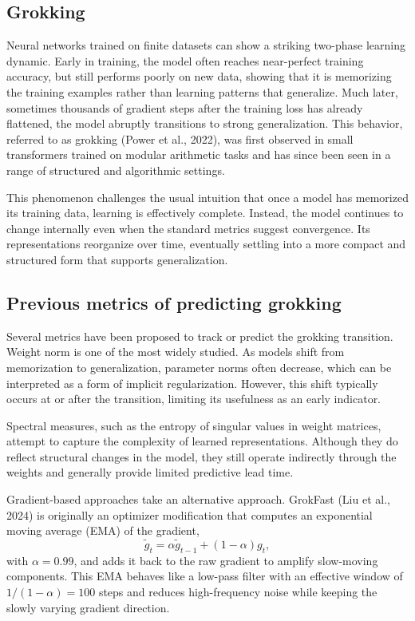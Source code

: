 \documentclass{article}
\begin{document}
\subsection{Grokking}
Neural networks trained on finite datasets can show a striking two-phase learning dynamic. Early in training, the model often reaches near-perfect training accuracy, but still performs poorly on new data, showing that it is memorizing the training examples rather than learning patterns that generalize. Much later, sometimes thousands of gradient steps after the training loss has already flattened, the model abruptly transitions to strong generalization. This behavior, referred to as grokking (Power et al., 2022), was first observed in small transformers trained on modular arithmetic tasks and has since been seen in a range of structured and algorithmic settings. 

\vspace{5pt}
This phenomenon challenges the usual intuition that once a model has memorized its training data, learning is effectively complete. Instead, the model continues to change internally even when the standard metrics suggest convergence. Its representations reorganize over time, eventually settling into a more compact and structured form that supports generalization. 

\subsection{Previous metrics of predicting grokking}

Several metrics have been proposed to track or predict the grokking transition. Weight norm is one of the most widely studied. As models shift from memorization to generalization, parameter norms often decrease, which can be interpreted as a form of implicit regularization. However, this shift typically occurs at or after the transition, limiting its usefulness as an early indicator. 

\vspace{3pt}

Spectral measures, such as the entropy of singular values in weight matrices, attempt to capture the complexity of learned representations. Although they do reflect structural changes in the model, they still operate indirectly through the weights and generally provide limited predictive lead time.
\vspace{3pt}


Gradient-based approaches take an alternative approach. GrokFast (Liu et al., 2024) is originally an optimizer modification that computes an exponential moving average (EMA) of the gradient,
\[
\tilde{g}_t = \alpha \tilde{g}_{t-1} + (1 - \alpha) g_t,
\]
with $\alpha = 0.99$, and adds it back to the raw gradient to amplify slow-moving components. This EMA behaves like a low-pass filter with an effective window of $1/(1-\alpha)=100$ steps and reduces high-frequency noise while keeping the slowly varying gradient direction.
\end{document}
